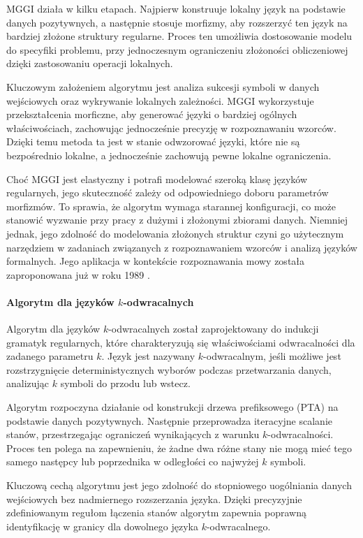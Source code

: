 MGGI działa w kilku etapach. Najpierw konstruuje lokalny język na podstawie danych pozytywnych, a następnie stosuje morfizmy, aby rozszerzyć ten język na bardziej złożone struktury regularne. Proces ten umożliwia dostosowanie modelu do specyfiki problemu, przy jednoczesnym ograniczeniu złożoności obliczeniowej dzięki zastosowaniu operacji lokalnych.  

Kluczowym założeniem algorytmu jest analiza sukcesji symboli w danych wejściowych oraz wykrywanie lokalnych zależności. MGGI wykorzystuje przekształcenia morficzne, aby generować języki o bardziej ogólnych właściwościach, zachowując jednocześnie precyzję w rozpoznawaniu wzorców. Dzięki temu metoda ta jest w stanie odwzorować języki, które nie są bezpośrednio lokalne, a jednocześnie zachowują pewne lokalne ograniczenia.  

Choć MGGI jest elastyczny i potrafi modelować szeroką klasę języków regularnych, jego skuteczność zależy od odpowiedniego doboru parametrów morfizmów. To sprawia, że algorytm wymaga starannej konfiguracji, co może stanowić wyzwanie przy pracy z dużymi i złożonymi zbiorami danych. Niemniej jednak, jego zdolność do modelowania złożonych struktur czyni go użytecznym narzędziem w zadaniach związanych z rozpoznawaniem wzorców i analizą języków formalnych. Jego aplikacja w kontekście rozpoznawania mowy została zaproponowana już w roku 1989 \cite{MGGI_SPEECH_RECONGNITION}. 


\paragraph*{Algorytm dla języków \( k \)-odwracalnych}  
Algorytm dla języków \( k \)-odwracalnych \cite{reversible-languages-algorithms} został zaprojektowany do indukcji gramatyk regularnych, które charakteryzują się właściwościami odwracalności dla zadanego parametru \( k \). Język jest nazywany \( k \)-odwracalnym, jeśli możliwe jest rozstrzygnięcie deterministycznych wyborów podczas przetwarzania danych, analizując \( k \) symboli do przodu lub wstecz. 

Algorytm rozpoczyna działanie od konstrukcji drzewa prefiksowego (PTA) na podstawie danych pozytywnych. Następnie przeprowadza iteracyjne scalanie stanów, przestrzegając ograniczeń wynikających z warunku \( k \)-odwracalności. Proces ten polega na zapewnieniu, że żadne dwa różne stany nie mogą mieć tego samego następcy lub poprzednika w odległości co najwyżej \( k \) symboli.  

Kluczową cechą algorytmu jest jego zdolność do stopniowego uogólniania danych wejściowych bez nadmiernego rozszerzania języka. Dzięki precyzyjnie zdefiniowanym regułom łączenia stanów algorytm zapewnia poprawną identyfikację w granicy dla dowolnego języka \( k \)-odwracalnego.  

